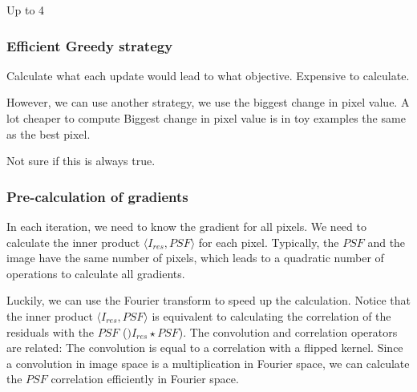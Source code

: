 Up to 4 


\subsubsection{Efficient Greedy strategy}

Calculate what each update would lead to what objective.
Expensive to calculate.

However, we can use another strategy, we use the biggest change in pixel value.
A lot cheaper to compute
Biggest change in pixel value is in toy examples the same as the best pixel. 

Not sure if this is always true.


\subsubsection{Pre-calculation of gradients}
In each iteration, we need to know the gradient for all pixels. We need to calculate the inner product $\langle I_{res},PSF\rangle$ for each pixel. Typically, the $PSF$ and the image have the same number of pixels, which leads to a quadratic number of operations to calculate all gradients.

Luckily, we can use the Fourier transform to speed up the calculation. Notice that the inner product $\langle I_{res},PSF\rangle$ is equivalent to calculating the correlation of the residuals with the $PSF$ ($)I_{res} \star PSF$). The convolution and correlation operators are related: The convolution is equal to a correlation with a flipped kernel. Since a convolution in image space is a multiplication in Fourier space, we can calculate the $PSF$ correlation efficiently in Fourier space.

